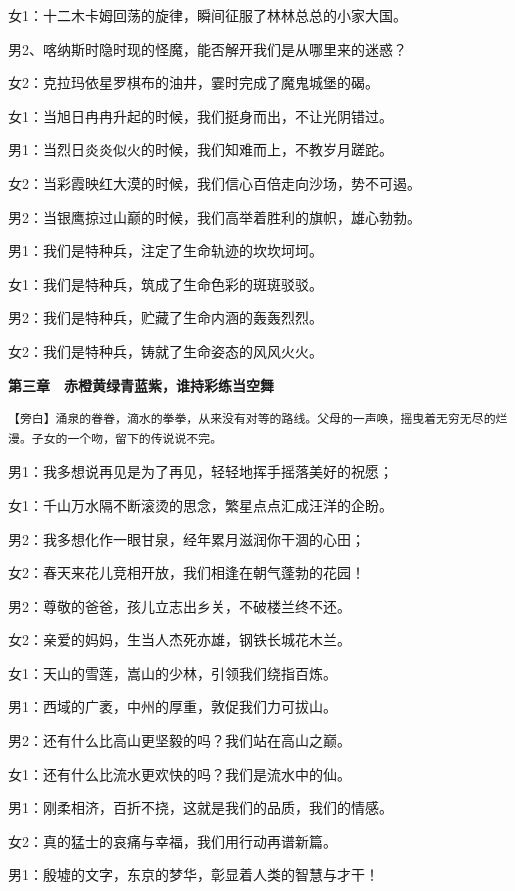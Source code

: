 \documentclass[openany]{ctexbook}
\begin{document}
女1：十二木卡姆回荡的旋律，瞬间征服了林林总总的小家大国。

男2、喀纳斯时隐时现的怪魔，能否解开我们是从哪里来的迷惑？

女2：克拉玛依星罗棋布的油井，霎时完成了魔鬼城堡的碣。

女1：当旭日冉冉升起的时候，我们挺身而出，不让光阴错过。

男1：当烈日炎炎似火的时候，我们知难而上，不教岁月蹉跎。

女2：当彩霞映红大漠的时候，我们信心百倍走向沙场，势不可遏。

男2：当银鹰掠过山巅的时候，我们高举着胜利的旗帜，雄心勃勃。

男1：我们是特种兵，注定了生命轨迹的坎坎坷坷。

女1：我们是特种兵，筑成了生命色彩的斑斑驳驳。

男2：我们是特种兵，贮藏了生命内涵的轰轰烈烈。

女2：我们是特种兵，铸就了生命姿态的风风火火。

\textbf{第三章　赤橙黄绿青蓝紫，谁持彩练当空舞}

\begin{verbatim}
【旁白】涌泉的眷眷，滴水的拳拳，从来没有对等的路线。父母的一声唤，摇曳着无穷无尽的烂漫。子女的一个吻，留下的传说说不完。
\end{verbatim}

男1：我多想说再见是为了再见，轻轻地挥手摇落美好的祝愿；

女1：千山万水隔不断滚烫的思念，繁星点点汇成汪洋的企盼。

男2：我多想化作一眼甘泉，经年累月滋润你干涸的心田；

女2：春天来花儿竞相开放，我们相逢在朝气蓬勃的花园！

男2：尊敬的爸爸，孩儿立志出乡关，不破楼兰终不还。

女2：亲爱的妈妈，生当人杰死亦雄，钢铁长城花木兰。

女1：天山的雪莲，嵩山的少林，引领我们绕指百炼。

男1：西域的广袤，中州的厚重，敦促我们力可拔山。

男2：还有什么比高山更坚毅的吗？我们站在高山之巅。

女1：还有什么比流水更欢快的吗？我们是流水中的仙。

男1：刚柔相济，百折不挠，这就是我们的品质，我们的情感。

女2：真的猛士的哀痛与幸福，我们用行动再谱新篇。

男1：殷墟的文字，东京的梦华，彰显着人类的智慧与才干！
\end{document}

